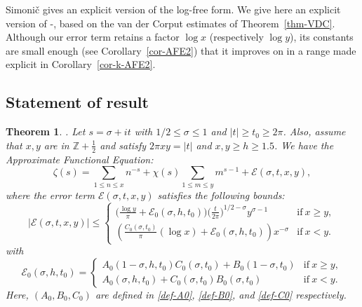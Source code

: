 \documentclass[11pt,letterpaper,oneside,reqno]{amsart}
\renewcommand{\^}[1]{\widehat{#1}}
\newcommand{\s}{\sigma}
\numberwithin{equation}{section}
\newtheorem{theorem}{Theorem}
\theoremstyle{remark}
\newcommand*{\thmref}[1]{Theorem~\ref{#1}}
\newcommand*{\corref}[1]{Corollary~\ref{#1}}
\begin{document}
\smallskip
Simoni\v{c} \cite[Theorem 4]{Simonic2020} gives an explicit version of the log-free form. We give here an explicit version of \cite[Lemma 15]{HL1921}-\cite[Theorem 4.13]{Titchmarsh}, based on the van der Corput estimates of \thmref{thm-VDC}. 
Although our error term retains a factor $\log x$ (respectively $\log y$), its constants are small enough (see \corref{cor-AFE2}) that it improves on \cite[Theorem~4]{Simonic2020} in a range made explicit in \corref{cor-k-AFE2}.
%
\subsection{Statement of result}
%
\begin{theorem} \label{thm-AFE2}.
Let $s = \sigma + it$ with $ 1/2\leq \sigma \leq 1$ and $|t| \geq t_0 \geq 2\pi$. Also, assume that $x,y$ are in $\mathbb{Z}+\frac12$ and satisfy $2\pi xy = |t|$ and $x,y\geq h\geq 1.5$. 
We have the Approximate Functional Equation:
\begin{equation}\label{AFE2-explicit}
\zeta(s) = \sum_{1 \le n \le x} n^{-s} + \chi(s)\sum_{1 \le m \le y} m^{s-1} + \mathcal{E}(\s,t,x,y),
\end{equation} 
where the error term $\mathcal{E}(\s,t, x, y)$ satisfies the following bounds:
\begin{equation}\label{bnd-E-all-x-y}
\left|\mathcal{E}(\s,t, x, y)\right|
\leq 
\begin{cases}
  \Big(  \frac{\log y}{\pi}+ \mathcal{E}_0(\sigma,h,t_0) \Big) \Big(\frac{t}{2\pi}\Big)^{1/2-\sigma} y^{\sigma-1}  &\text{if}\ x \ge  y, \\
\left(\frac{C_0(\sigma,t_0)}{\pi} (\log x) +\mathcal{E}_0(\sigma, h, t_0) \right)x^{-\s} &\text{if}\ x < y.
\end{cases}
\end{equation}
with
\begin{equation}\label{def-E0-all-x-y}
    \mathcal{E}_0(\s,h,t_0) =
\begin{cases}
    A_{0}(1-\sigma,h,t_0)C_0(\sigma,t_0)  + B_{0}(1-\sigma,t_0) &\text{if}\ x \ge y,
  \\
  A_0(\s,h,t_0)  + C_0(\s, t_0) B_0(\s,t_0) \ &\text{if}\ x < y.
\end{cases}
\end{equation}
Here, $(A_0, B_0, C_0)$ are defined in \eqref{def-A0},  \eqref{def-B0}, and \eqref{def-C0} respectively. 
\end{theorem}
%
\end{document}
